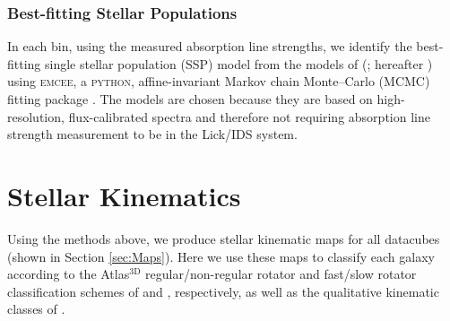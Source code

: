 \documentclass[fleqn,usenatbib,useAMS]{mnras}
\begin{document}
		\subsubsection{Best-fitting Stellar Populations}
			\label{subsubsec:stellarPop}
			In each bin, using the measured absorption line strengths, we identify the best-fitting single stellar population (SSP) model from the models of \citeauthor{Thomas2010} (\citeyear{Thomas2010}; hereafter ) using \textsc{emcee}, a \textsc{python}, affine-invariant Markov chain Monte--Carlo (MCMC) fitting package \citep{Foreman-Mackey2013}. The  models are chosen because they are based on high-resolution, flux-calibrated spectra and therefore not requiring absorption line strength measurement to be in the Lick/IDS system. 

\section{Stellar Kinematics}
	\label{sec:StarKine}
	Using the methods above, we produce stellar kinematic maps for all datacubes (shown in Section \ref{sec:Maps}). Here we use these maps to classify each galaxy according to the Atlas$^\text{3D}$ regular/non-regular rotator and fast/slow rotator classification schemes of \citet{Krajnovic2006} and \citet{Cappellari2016}, respectively, as well as the qualitative kinematic classes of \citet{Krajnovic2011}. 

\end{document}
